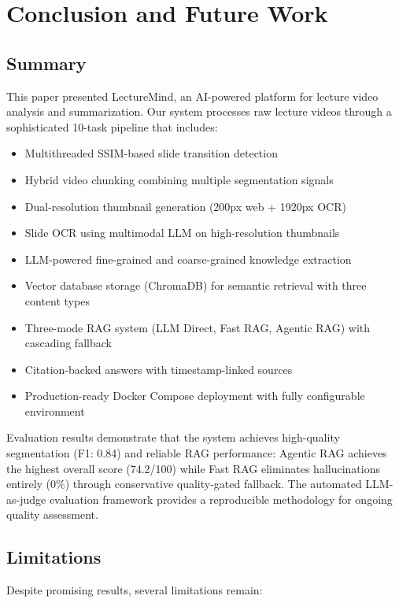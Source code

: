 \section{Conclusion and Future Work}
\label{sec:conclusion}

\subsection{Summary}

This paper presented LectureMind, an AI-powered platform for lecture video analysis and summarization. Our system processes raw lecture videos through a sophisticated 10-task pipeline that includes:

\begin{itemize}
    \item Multithreaded SSIM-based slide transition detection
    \item Hybrid video chunking combining multiple segmentation signals
    \item Dual-resolution thumbnail generation (200px web + 1920px OCR)
    \item Slide OCR using multimodal LLM on high-resolution thumbnails
    \item LLM-powered fine-grained and coarse-grained knowledge extraction
    \item Vector database storage (ChromaDB) for semantic retrieval with three content types
    \item Three-mode RAG system (LLM Direct, Fast RAG, Agentic RAG) with cascading fallback
    \item Citation-backed answers with timestamp-linked sources
    \item Production-ready Docker Compose deployment with fully configurable environment
\end{itemize}

Evaluation results demonstrate that the system achieves high-quality segmentation (F1: 0.84) and reliable RAG performance: Agentic RAG achieves the highest overall score (74.2/100) while Fast RAG eliminates hallucinations entirely (0\%) through conservative quality-gated fallback. The automated LLM-as-judge evaluation framework provides a reproducible methodology for ongoing quality assessment.

\subsection{Limitations}

Despite promising results, several limitations remain:


